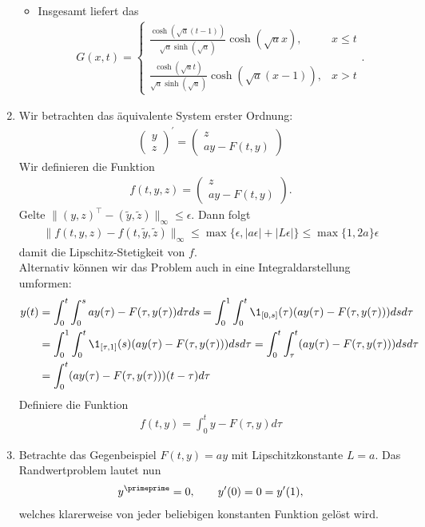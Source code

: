 \begin{solution}
\begin{enumerate}[label = \textbf{\alph*)}]
\begin{itemize}
    \item Insgesamt liefert das
    \begin{align*}
      G(x,t) = \begin{cases}
      \frac{\cosh(\sqrt{a}(t-1))}{\sqrt{a}\sinh(\sqrt{a})}\cosh(\sqrt{a}x), & x \leq t \\
      \frac{\cosh(\sqrt{a}t)}{\sqrt{a}\sinh(\sqrt{a})}\cosh(\sqrt{a}(x-1)), & x > t
      \end{cases}.
    \end{align*}
  \end{itemize}
  \item Wir betrachten das äquivalente System erster Ordnung:
  \begin{align*}
    \begin{pmatrix}
      y \\ z
    \end{pmatrix}^{\prime} =
    \begin{pmatrix}
      z \\ ay - F(t,y)
    \end{pmatrix}
  \end{align*}
  Wir definieren die Funktion
  \begin{align*}
    f(t,y,z) = \begin{pmatrix}
      z \\ ay - F(t,y)
    \end{pmatrix}.
  \end{align*}
  Gelte $\|(y,z)^{\top} - (\widetilde{y},\widetilde{z})\|_{\infty} \leq \epsilon$. Dann folgt
  \begin{align*}
    \|f(t,y,z) - f(t,\widetilde{y},\widetilde{z})\|_{\infty} \leq \max\{\epsilon, |a\epsilon| + |L\epsilon|\} \leq \max\{1,2a\}\epsilon
  \end{align*}
  damit die Lipschitz-Stetigkeit von $f$. \\
  Alternativ können wir das Problem auch in eine Integraldarstellung umformen:
  \begin{align*}
    y(t) &= \int_0^t\int_0^say(\tau) - F(\tau,y(\tau))d\tau ds
    = \int_0^1\int_0^t \1_{[0,s]}(\tau)(ay(\tau) - F(\tau,y(\tau)))ds d\tau \\
    &= \int_0^1\int_0^t \1_{[\tau,1]}(s)(ay(\tau) - F(\tau,y(\tau)))ds d\tau
    = \int_0^t\int_\tau^t (ay(\tau) - F(\tau,y(\tau)))ds d\tau \\
    &= \int_0^t(ay(\tau) - F(\tau,y(\tau)))(t - \tau) d\tau
  \end{align*}
  Definiere die Funktion
  \begin{align*}
    f(t,y) = \int_0^ty - F(\tau,y) d\tau
  \end{align*}
  \item Betrachte das Gegenbeispiel $F(t,y) = ay$ mit Lipschitzkonstante $L = a$. Das Randwertproblem lautet nun
  \begin{align*}
    y^{\primeprime} = 0, \qquad y^{\prime}(0) = 0 = y^{\prime}(1),
  \end{align*}
  welches klarerweise von jeder beliebigen konstanten Funktion gelöst wird.
\end{enumerate}
\end{solution}
